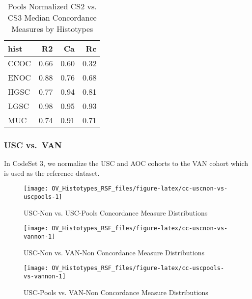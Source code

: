 \documentclass[
]{report}
\begin{document}
\begin{table}

\caption{\label{tab:pools-cs2norm-vs-cs3}Pools Normalized CS2 vs. CS3 Median Concordance Measures by Histotypes}
\centering
\begin{tabular}[t]{l|r|r|r}
\hline
hist & R2 & Ca & Rc\\
\hline
CCOC & 0.66 & 0.60 & 0.32\\
\hline
ENOC & 0.88 & 0.76 & 0.68\\
\hline
HGSC & 0.77 & 0.94 & 0.81\\
\hline
LGSC & 0.98 & 0.95 & 0.93\\
\hline
MUC & 0.74 & 0.91 & 0.71\\
\hline
\end{tabular}
\end{table}

\hypertarget{usc-vs.-van}{%
\subsubsection{USC vs.~VAN}\label{usc-vs.-van}}

In CodeSet 3, we normalize the USC and AOC cohorts to the VAN cohort which is used as the reference dataset.

\begin{figure}[H]

{\centering \texttt{[image: OV\_Histotypes\_RSF\_files/figure-latex/cc-uscnon-vs-uscpools-1]} 

}

\caption{USC-Non vs. USC-Pools Concordance Measure Distributions}\label{fig:cc-uscnon-vs-uscpools}
\end{figure}

\begin{figure}[H]

{\centering \texttt{[image: OV\_Histotypes\_RSF\_files/figure-latex/cc-uscnon-vs-vannon-1]} 

}

\caption{USC-Non vs. VAN-Non Concordance Measure Distributions}\label{fig:cc-uscnon-vs-vannon}
\end{figure}

\begin{figure}[H]

{\centering \texttt{[image: OV\_Histotypes\_RSF\_files/figure-latex/cc-uscpools-vs-vannon-1]} 

}

\caption{USC-Pools vs. VAN-Non Concordance Measure Distributions}\label{fig:cc-uscpools-vs-vannon}
\end{figure}
\end{document}
